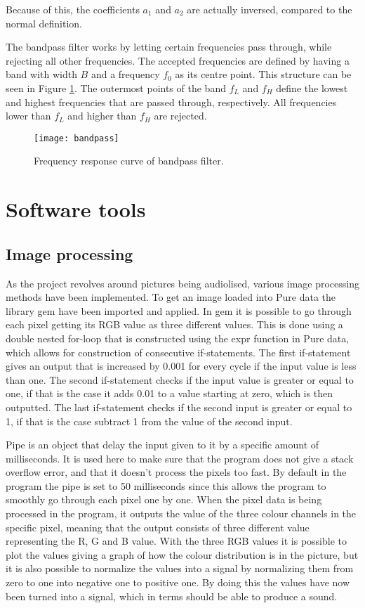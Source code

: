 Because of this, the coefficients \(a_1\) and \(a_2\) are actually inversed, compared to the normal definition.

The bandpass filter works by letting certain frequencies pass through, while rejecting all other frequencies. The accepted frequencies are defined by having a band with width \(B\) and a frequency \(f_0\) as its  centre point. This structure can be seen in Figure \ref{fig:bandpass}. The outermost points of the band \(f_L\) and \(f_H\) define the lowest and highest frequencies that are passed through, respectively. All frequencies lower than \(f_L\) and higher than \(f_H\) are rejected.

\begin{figure}
\centering
\texttt{[image: bandpass]}
\caption{Frequency response curve of bandpass filter.}
\label{fig:bandpass}
\end{figure}



\section{Software tools}\label{sec:softwareTools}
	\subsection{Image processing}\label{sub:imageprocessing}
	As the project revolves around pictures being audiolised, various image processing methods have been implemented. To get an image loaded into Pure data the library gem have been imported and applied. In gem it is possible to go through each pixel getting its RGB value as three different values. This is done using a double nested for-loop that is constructed using the expr function in Pure data, which allows for construction of consecutive if-statements. The first if-statement gives an output that is increased by 0.001 for every cycle if the input value is less than one. The second if-statement checks if the input value is greater or equal to one, if that is the case it adds 0.01 to a value starting at zero, which is then outputted. The last if-statement checks if the second input is greater or equal to 1, if that is the case subtract 1 from the value of the second input.
	
	Pipe is an object that delay the input given to it by a specific amount of milliseconds. It is used here to make sure that the program does not give a stack overflow error, and that it doesn't process the pixels too fast. By default in the program the pipe is set to 50 milliseconds since this allows the program to smoothly go through each pixel one by one. 
	When the pixel data is being processed in the program, it outputs the value of the three colour channels in the specific pixel, meaning that the output consists of three different value representing the R, G and B value. With the three RGB values it is possible to plot the values giving a graph of how the colour distribution is in the picture, but it is also possible to normalize the values into a signal by normalizing them from zero to one into negative one to positive one. By doing this the values have now been turned into a signal, which in terms should be able to produce a sound.

